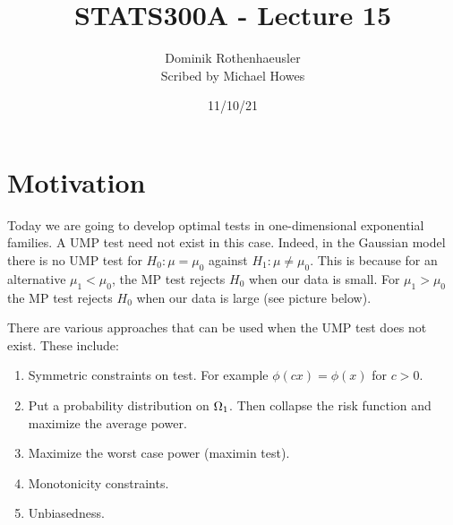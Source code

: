 




\title{STATS300A - Lecture 15}
\author{Dominik Rothenhaeusler\\ Scribed by Michael Howes}
\date{11/10/21}

\pagestyle{fancy}
\fancyhf{}


\maketitle
\tableofcontents
\section{Motivation}
Today we are going to develop optimal tests in one-dimensional exponential families. A UMP test need not exist in this case. Indeed, in the Gaussian model there is no UMP test for $H_0 : \mu =\mu_0$ against $H_1 : \mu \neq \mu_0$. This is because for an alternative $\mu_1 < \mu_0$, the MP test rejects $H_0$ when our data is small. For $\mu_1 >\mu_0$ the MP test rejects $H_0$ when our data is large (see picture below).
\begin{center}
    
\end{center}


There are various approaches that can be used when the UMP test does not exist. These include:
\begin{enumerate}
    \item Symmetric constraints on test. For example $\phi (c x) = \phi(x)$ for $c >0$.
    \item Put a probability distribution on ${{\Omega}}_1$. Then collapse the risk function and maximize the average power.
    \item Maximize the worst case power (maximin test).
    \item Monotonicity constraints.
    \item Unbiasedness.
\end{enumerate}
